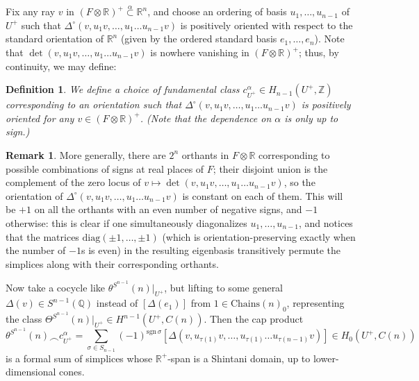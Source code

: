 \documentclass[10pt]{amsart}
\newtheorem{defn}[thm]{Definition}
\theoremstyle{definition}
\newtheorem{rem}[thm]{Remark}
\newcommand{\Z}{\mathbb{Z}}
\newcommand{\Q}{\mathbb{Q}}
\newcommand{\R}{\mathbb{R}}
\newcommand{\sgn}{\mathrm{sgn}}
\newcommand{\Chains}{\mathrm{Chains}}
\numberwithin{equation}{section}
\begin{document}
    Fix any ray $v$ in $(F\otimes \R)^+\overset{\alpha}\subset \R^n$, and choose an ordering of basis $u_1,\ldots, u_{n-1}$ of $U^+$ such that $\Delta^\circ(v, u_{1}v, \ldots,u_{1}\ldots u_{n-1} v)$ is positively oriented with respect to the standard orientation of $\R^n$ (given by the ordered standard basis $e_1, \ldots, e_n$). Note that $\det(v, u_{1}v, \ldots,u_{1}\ldots u_{n-1} v)$ is nowhere vanishing in $(F\otimes \R)^+$; thus, by continuity, we may define:

    \begin{defn} \label{defn:fundclass}
        We define a choice of fundamental class $c_{U^+}^\alpha\in H_{n-1}(U^+,\Z)$ corresponding to an orientation such that $\Delta^\circ(v, u_{1}v, \ldots,u_{1}\ldots u_{n-1} v)$ is positively oriented for \emph{any} $v\in (F\otimes \R)^+$. (Note that the dependence on $\alpha$ is only up to sign.)
    \end{defn}

    \begin{rem} \label{rem:orthflip}
        More generally, there are $2^n$ orthants in $F\otimes \R$ corresponding to possible combinations of signs at real places of $F$; their disjoint union is the complement of the zero locus of $v\mapsto \det(v, u_{1}v, \ldots,u_{1}\ldots u_{n-1} v)$, so the orientation of $\Delta^\circ(v, u_{1}v, \ldots,u_{1}\ldots u_{n-1} v)$ is constant on each of them. This will be $+1$ on all the orthants with an even number of negative signs, and $-1$ otherwise: this is clear if one simultaneously diagonalizes $u_1,\ldots, u_{n-1}$, and notices that the matrices $\mathrm{diag}(\pm 1, \ldots, \pm 1)$ (which is orientation-preserving exactly when the number of $-1$s is even) in the resulting eigenbasis transitively permute the simplices along with their corresponding orthants.
    \end{rem}
    
    Now take a cocycle like $\theta^{S^{n-1}}(n)|_{U^+}$, but lifting to some general $\Delta(v)\in S^{n-1}(\Q)$ instead of $[\Delta(e_1)]$ from $1\in \Chains(n)_0$, representing the class $\Theta^{S^{n-1}}(n)|_{U^+}\in H^{n-1}(U^+,C(n))$. Then the cap product
    \begin{equation} \label{eq:fakeshin}
    \theta^{S^{n-1}}(n)\frown c_{U^+}^\alpha = \sum_{\sigma\in S_{n-1}} (-1)^{\sgn\,\sigma}[\Delta(v, u_{\tau(1)}v, \ldots,u_{\tau(1)}\ldots u_{\tau(n-1)} v)] \in H_0(U^+, C(n))
    \end{equation}
    is a formal sum of simplices whose $\R^+$-span is a Shintani domain, up to lower-dimensional cones.
\end{document}

